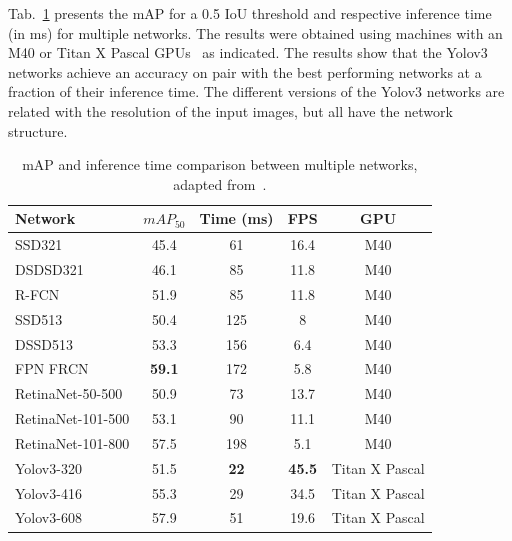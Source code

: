 %
%
%
%
%

Tab.~\ref{tab:yolov3_performance_metrics} presents the mAP
for a 0.5 IoU threshold and respective inference time (in ms) for
multiple networks. The results were obtained using machines with an M40 or Titan
X Pascal GPUs~\cite{yolov3} as indicated. The results show that the
Yolov3 networks achieve an accuracy on pair with the best performing networks at
a fraction of their inference time. The different versions of the Yolov3
networks are related with the resolution of the input images, but all have the
network structure.

\begin{table}[!htb]
	\renewcommand{\arraystretch}{1.2} %
	\centering
	\begin{tabular}{lcccc}
		\toprule
		Network           & $mAP_{50}$ & Time (ms) & FPS & GPU  \\
		\midrule
		SSD321		& 45.4	& 61 & 16.4 & M40\\
		DSDSD321	& 46.1	& 85 & 11.8& M40\\
		R-FCN		& 51.9	& 85 & 11.8& M40\\
		SSD513		& 50.4	& 125 & 8& M40\\
		DSSD513		& 53.3	& 156 & 6.4& M40\\
		FPN FRCN	& \textbf{59.1} & 172 & 5.8& M40\\
		RetinaNet-50-500 & 50.9	& 73 & 13.7& M40\\
		RetinaNet-101-500 & 53.1	& 90 & 11.1& M40\\
		RetinaNet-101-800 & 57.5	& 198 & 5.1& M40\\
		Yolov3-320 & 51.5	& \textbf{22} & \textbf{45.5}& Titan X Pascal\\
		Yolov3-416 & 55.3	& 29 & 34.5& Titan X Pascal\\
		Yolov3-608 & 57.9	& 51 & 19.6& Titan X Pascal\\
		\bottomrule
	\end{tabular}
	\caption[Table caption shown in TOC.]{mAP and inference time comparison between multiple networks, adapted from~\cite{yolov3, Focal_Loss}.}
	\label{tab:yolov3_performance_metrics}
\end{table}

